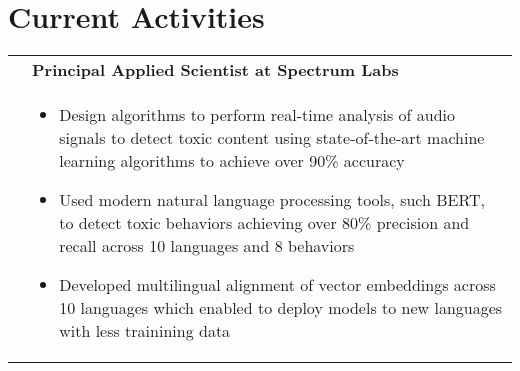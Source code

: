 \documentclass[a4paper,10pt]{article}
\begin{document}
\section{Current Activities }
\begin{tabularx}{\textwidth}{>{\centering\arraybackslash}X p{} }

 {\sl Oct 2020 -- }  &   \textbf{Principal Applied Scientist at Spectrum Labs} \\
      & \begin{itemize}
      \item Design algorithms to perform real-time analysis of audio signals to detect toxic content using state-of-the-art machine learning algorithms to achieve over 90\% accuracy
      \item Used modern natural language processing tools, such BERT, to detect toxic behaviors achieving over 80\% precision and recall across 10 languages and 8 behaviors
      \item Developed multilingual alignment of vector embeddings across 10 languages which enabled to deploy models to new languages with less trainining data
       \end{itemize} \\[-1.5ex]


\end{tabularx}
\end{document}
